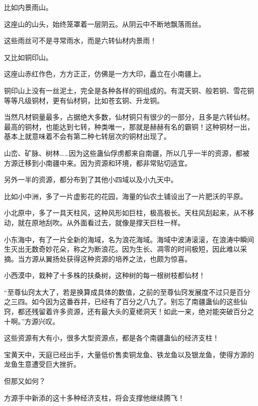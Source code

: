 \begin{this_body}
比如内景雨山。

这座山的山头，始终笼罩着一层阴云。从阴云中不断地飘落雨丝。

这些雨丝可不是寻常雨水，而是六转仙材内景雨！

又比如铜印山。

这座山赤红作色，方方正正，仿佛是一方大印，矗立在小南疆上。

铜印山上没有一丝泥土，完全是各种各样的铜组成的。有混天铜、般若铜、雪花铜等等凡级铜材，更有仙材铜，比如苍玄铜、升龙铜。

当然凡材铜量最多，占据绝大多数，仙材铜只有很少的一部分，且多是六转仙材。最高的铜材，也能达到七转，种类唯一，那就是赫赫有名的霸铜！这种铜材一出，基本上就意味着不会有第二种七转层次的铜材出现了。

山峦、矿脉、树林……因为这些蛊仙俘虏都来自南疆，所以几乎一半的资源，都被方源迁移到小南疆中来。因为资源和环境，都非常贴切适宜。

另外一半的资源，都分布到了其他小四域以及小九天中。

比如小中洲，多了一片虚影花的花园，海量的仙农土铺设出了一片肥沃的平原。

小北原中，多了一具天柱风，这种风形如巨柱，极高极长。天柱风刮起来，从不移动，就在原地刮吹。从外面看过去，就像是撑天巨柱一样。

小东海中，有了一片全新的海域，名为浪花海域。海域中波涛滚滚，在浪涛中瞬间生灭出无数奇妙花朵，称之为断浪花。因为生长、凋零的时间极短，因此难以采摘。当方源从翼扬处获得这种资源的培养之法，也颇为惊喜。

小西漠中，栽种了十多株的扶桑树，这种树的每一根树枝都仙材！

“至尊仙窍太大了，若是换算成具体的数值，之前的至尊仙窍发展度不过只是百分之三四。如今因为这番吞并，已经有了百分之八九了。别忘了南疆蛊仙的这些仙窍，都还残留着许多资源，还有最大头的夏槎洞天！如此一来，绝对能突破百分之十啊。”方源兴叹。

这些资源有大有小，很多大型资源点，都是各个南疆蛊仙的经济支柱！

宝黄天中，天庭已经出手，大量低价售卖铜龙鱼、铁龙鱼以及银龙鱼，使得方源的龙鱼生意遭受巨大挫折。

但那又如何？

方源手中新添的这十多种经济支柱，将会支撑他继续腾飞！

\end{this_body}

